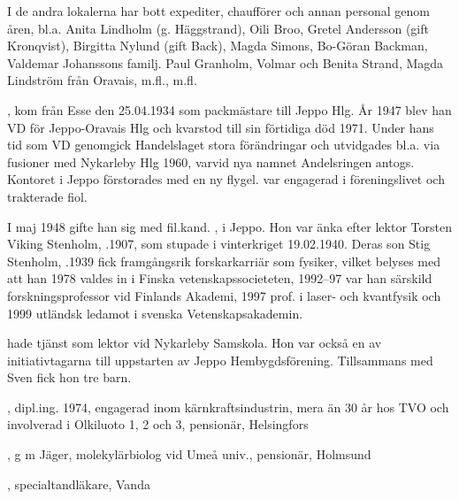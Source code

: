I de andra lokalerna har bott expediter, chaufförer och annan personal genom åren, bl.a. Anita Lindholm (g. Häggstrand), Oili Broo, Gretel Andersson (gift Kronqvist), Birgitta Nylund (gift Back), Magda Simons, Bo-Göran Backman, Valdemar Johanssons familj. Paul Granholm, Volmar och Benita Strand, Magda Lindström från Oravais, m.fl., m.fl.

, kom från Esse den 25.04.1934 som packmästare till Jeppo Hlg. År 1947 blev han VD för Jeppo-Oravais Hlg och kvarstod till sin förtidiga död 1971. Under hans tid som VD genomgick Handelslaget stora förändringar och utvidgades bl.a. via fusioner med Nykarleby Hlg 1960, varvid nya namnet Andelsringen antogs. Kontoret i Jeppo förstorades med en ny flygel.  var engagerad i föreningslivet och trakterade fiol.

I maj 1948 gifte han sig med fil.kand. , i Jeppo. Hon var änka efter lektor Torsten Viking Stenholm, .1907, som stupade i vinterkriget 19.02.1940. Deras son Stig Stenholm, .1939 fick framgångsrik forskarkarriär som fysiker, vilket belyses med att han 1978 valdes in i Finska vetenskapssocieteten, 1992--97 var han särskild forskningsprofessor vid Finlands Akademi, 1997 prof. i laser- och kvantfysik och 1999 utländsk ledamot i svenska Vetenskapsakademin.

 hade tjänst som lektor vid Nykarleby Samskola. Hon var också en av initiativtagarna till uppstarten av Jeppo Hembygdsförening. Tillsammans med Sven fick hon tre barn.
\begin{jhchildren}
  \item {}, dipl.ing. 1974, engagerad inom kärnkraftsindustrin, mera än 30 år hos TVO och involverad i Olkiluoto 1, 2 och 3, pensionär, Helsingfors
  \item {}, g m Jäger, molekylärbiolog vid Umeå univ., pensionär, Holmsund
  \item {}, specialtandläkare, Vanda
\end{jhchildren}



%


